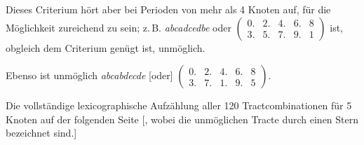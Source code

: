 Dieses Criterium hört aber bei Perioden von mehr als 4 Knoten auf, für
die Möglichkeit zureichend zu sein; z.\,B. \emph{abcadcedbe} oder
$\left(\begin{array}{ccccc}0. & 2. & 4. & 6. & 8 \\ 3. & 5. & 7. & 9. & 1\end{array}\right)$
ist, obgleich dem Criterium genügt ist, unmöglich.

Ebenso ist unmöglich \emph{abcabdecde} [oder]
$\left(\begin{array}{ccccc}0. & 2. & 4. & 6. & 8 \\ 3. & 7. & 1. & 9. & 5\end{array}\right)$.

Die vollständige lexicographische Aufzählung aller 120 Tractcombinationen
für 5 Knoten auf der folgenden Seite [, wobei die unmöglichen Tracte durch
einen Stern bezeichnet sind.]
